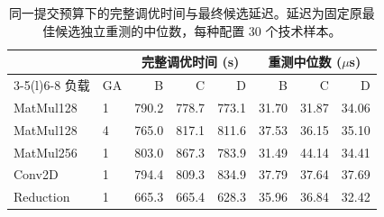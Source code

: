 \begin{table}[tbp]
\centering
\caption{同一提交预算下的完整调优时间与最终候选延迟。延迟为固定原最佳候选独立重测的中位数，每种配置 30 个技术样本。}
\label{tab:operator-overview}
\small
\begin{tabular*}{\textwidth}{@{\extracolsep{\fill}}llrrrrrr@{}}
\toprule
 & & \multicolumn{3}{c}{完整调优时间 (s)} & \multicolumn{3}{c}{重测中位数 ($\mu$s)} \\
\cmidrule(lr){3-5}\cmidrule(l){6-8}
负载 & GA & B & C & D & B & C & D \\
\midrule
MatMul128 & 1 & 790.2 & 778.7 & 773.1 & 31.70 & 31.87 & 34.06 \\
MatMul128 & 4 & 765.0 & 817.1 & 811.6 & 37.53 & 36.15 & 35.10 \\
MatMul256 & 1 & 803.0 & 867.3 & 783.9 & 31.49 & 44.14 & 34.41 \\
Conv2D & 1 & 794.4 & 809.3 & 834.9 & 37.79 & 37.64 & 37.69 \\
Reduction & 1 & 665.3 & 665.4 & 628.3 & 35.96 & 36.84 & 32.42 \\
\bottomrule
\end{tabular*}
\end{table}
